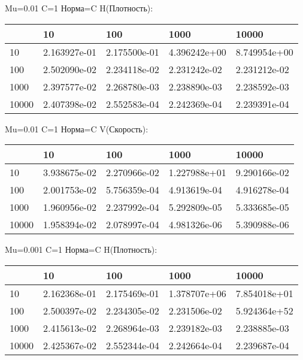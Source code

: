 \documentclass[a4paper, 12pt]{article}
\begin{document}
\bigskip
\bigskip
\bigskip


Mu=0.01  C=1 Норма=C H(Плотность):


\begin{tabular}{lllll}
\toprule
{} &         10    &         100   &         1000  &         10000 \\
\midrule
10    &  2.163927e-01 &  2.175500e-01 &  4.396242e+00 &  8.749954e+00 \\
100   &  2.502090e-02 &  2.234118e-02 &  2.231242e-02 &  2.231212e-02 \\
1000  &  2.397577e-02 &  2.268780e-03 &  2.238890e-03 &  2.238592e-03 \\
10000 &  2.407398e-02 &  2.552583e-04 &  2.242369e-04 &  2.239391e-04 \\
\bottomrule
\end{tabular}



\bigskip
\bigskip
\bigskip


Mu=0.01  C=1 Норма=C V(Скорость):


\begin{tabular}{lllll}
\toprule
{} &         10    &         100   &         1000  &         10000 \\
\midrule
10    &  3.938675e-02 &  2.270966e-02 &  1.227988e+01 &  9.290166e-02 \\
100   &  2.001753e-02 &  5.756359e-04 &  4.913619e-04 &  4.916278e-04 \\
1000  &  1.960956e-02 &  2.237992e-04 &  5.292809e-05 &  5.333685e-05 \\
10000 &  1.958394e-02 &  2.078997e-04 &  4.981326e-06 &  5.390988e-06 \\
\bottomrule
\end{tabular}



\bigskip
\bigskip
\bigskip


Mu=0.001  C=1 Норма=C H(Плотность):


\begin{tabular}{lllll}
\toprule
{} &         10    &         100   &         1000  &         10000 \\
\midrule
10    &  2.162368e-01 &  2.175469e-01 &  1.378707e+06 &  7.854018e+01 \\
100   &  2.500397e-02 &  2.234305e-02 &  2.231506e-02 &  5.924364e+52 \\
1000  &  2.415613e-02 &  2.268964e-03 &  2.239182e-03 &  2.238885e-03 \\
10000 &  2.425367e-02 &  2.552344e-04 &  2.242664e-04 &  2.239687e-04 \\
\bottomrule
\end{tabular}
\end{document}

